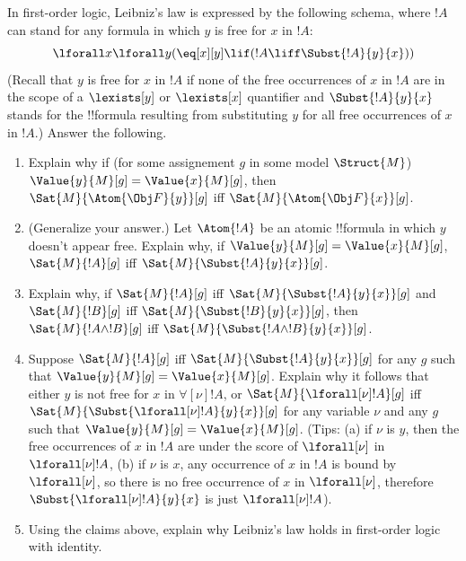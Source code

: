 \documentclass[../../../../include/open-logic-section]{subfiles}
\begin{document}
\begin{prob}
In first-order logic, Leibniz's law is expressed by the following schema, where $!A$ can stand for any formula in which $y$ is free for $x$ in $!A$:
$$\lforall x \lforall y (\eq[x][y] \lif (!A \liff \Subst{!A}{y}{x}))$$
(Recall that $y$ is free for $x$ in $!A$ if none of the free occurrences of $x$ in $!A$ are in the scope of a $\lexists[y]$ or $\lexists[x]$ quantifier and $\Subst{!A}{y}{x}$ stands for the !!{formula} resulting from substituting $y$ for all free occurrences of $x$ in $!A$.) Answer the following.
\begin{enumerate}
	\item Explain why if (for some assignement $g$ in some model $\Struct{M}$) $\Value{y}{M}[g] = \Value{x}{M}[g]$, then $\Sat{M}{\Atom{\Obj F}{y}}[g]$ iff $\Sat{M}{\Atom{\Obj F}{x}}[g]$. 
	\item (Generalize your answer.) Let $\Atom{!A}$ be an atomic !!{formula} in which $y$ doesn't appear free. Explain why, if $\Value{y}{M}[g] = \Value{x}{M}[g]$, $\Sat{M}{!A}[g]$ iff $\Sat{M}{\Subst{!A}{y}{x}}[g]$.
	\item Explain why, if $\Sat{M}{!A}[g]$ iff $\Sat{M}{\Subst{!A}{y}{x}}[g]$ and $\Sat{M}{!B}[g]$ iff $\Sat{M}{\Subst{!B}{y}{x}}[g]$, then $\Sat{M}{!A \land !B}[g]$ iff $\Sat{M}{\Subst{!A \land !B}{y}{x}}[g]$.
	\item Suppose $\Sat{M}{!A}[g]$ iff $\Sat{M}{\Subst{!A}{y}{x}}[g]$ for any $g$ such that $\Value{y}{M}[g] = \Value{x}{M}[g]$. Explain why it follows that either $y$ is not free for $x$ in $\forall[\nu]!A$, or $\Sat{M}{\lforall[\nu]!A}[g]$ iff $\Sat{M}{\Subst{\lforall[\nu]!A}{y}{x}}[g]$ for any variable $\nu$ and any $g$ such that $\Value{y}{M}[g] = \Value{x}{M}[g]$. (Tips: (a) if $\nu$ is $y$, then the free occurrences of $x$ in $!A$ are under the score of $\lforall[\nu]$ in $\lforall[\nu]!A$, (b) if $\nu$ is $x$, any occurrence of $x$ in $!A$ is bound by $\lforall[\nu]$, so there is no free occurrence of $x$ in $\lforall[\nu]$, therefore  $\Subst{\lforall[\nu]!A}{y}{x}$ is just $\lforall[\nu]!A$).
	\item Using the claims above, explain why Leibniz's law holds in first-order logic with identity. 
\end{enumerate}
\end{prob}
\end{document}
